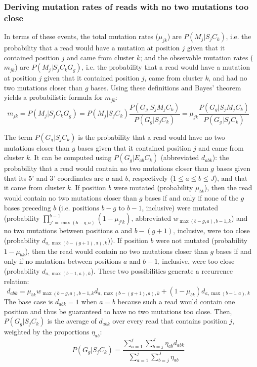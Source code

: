 \documentclass{article}
\begin{document}
\subsubsection{Deriving mutation rates of reads with no two mutations too close}
\label{calc_p_mut_noclose}

In terms of these events, the total mutation rates ($\mu_{jk}$) are $P(M_j | S_j C_k)$, i.e. the probability that a read would have a mutation at position $j$ given that it contained position $j$ and came from cluster $k$; and the observable mutation rates ($m_{jk}$) are $P(M_j | S_j C_k G_g)$, i.e. the probability that a read would have a mutation at position $j$ given that it contained position $j$, came from cluster $k$, and had no two mutations closer than $g$ bases.
Using these definitions and Bayes' theorem yields a probabilistic formula for $m_{jk}$:
\begin{equation}
    m_{jk} = P(M_j | S_j C_k G_g) = P(M_j | S_j C_k) \frac{P(G_g | S_j M_j C_k)}{P(G_g | S_j C_k)} = \mu_{jk} \frac{P(G_g | S_j M_j C_k)}{P(G_g | S_j C_k)}
\end{equation}

The term $P(G_g | S_j C_k)$ is the probability that a read would have no two mutations closer than $g$ bases given that it contained position $j$ and came from cluster $k$.
It can be computed using $P(G_g | E_{ab} C_k)$ (abbreviated $d_{abk}$): the probability that a read would contain no two mutations closer than $g$ bases given that its 5' and 3' coordinates are $a$ and $b$, respectively ($1 \le a \le b \le J$), and that it came from cluster $k$.
If position $b$ were mutated (probability $\mu_{bk}$), then the read would contain no two mutations closer than $g$ bases if and only if none of the $g$ bases preceding $b$ (i.e. positions $b - g$ to $b - 1$, inclusive) were mutated (probability $\prod_{j'=\max(b-g, a)}^{b-1}(1 - \mu_{j'k})$, abbreviated $w_{\max(b-g, a),b-1,k}$) and no two mutations between positions $a$ and $b - (g + 1)$, inclusive, were too close (probability $d_{a,\max(b-(g+1), a),k})$).
If position $b$ were not mutated (probability $1 - \mu_{bk}$), then the read would contain no two mutations closer than $g$ bases if and only if no mutations between positions $a$ and $b - 1$, inclusive, were too close (probability $d_{a,\max(b-1,a),k}$).
These two possibilities generate a recurrence relation:
\begin{equation}
    d_{abk} = \mu_{bk} w_{\max(b-g, a),b-1,k} d_{a,\max(b-(g+1), a),k} + (1 - \mu_{bk}) d_{a,\max(b-1,a),k}
\end{equation}
The base case is $d_{abk} = 1$ when $a = b$ because such a read would contain one position and thus be guaranteed to have no two mutations too close.
Then, $P(G_g | S_j C_k)$ is the average of $d_{abk}$ over every read that contains position $j$, weighted by the proportions $\eta_{ab}$:
\begin{equation}
    P(G_g | S_j C_k) = \frac{\sum_{a=1}^{j}\sum_{b=j}^{J}\eta_{ab}d_{abk}}{\sum_{a=1}^{j}\sum_{b=j}^{J}\eta_{ab}}
\end{equation}
\end{document}
